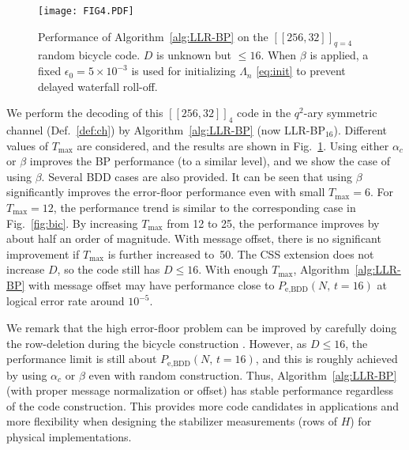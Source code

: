 \documentclass{ieeeaccess}
\theoremstyle{definition}		%
\begin{document}
\begin{figure} 
	\centering \texttt{[image: FIG4.PDF]}
	\caption{
	Performance of Algorithm~\ref{alg:LLR-BP} on the $[[256,32]]_{q=4}$ random bicycle code. $D$ is unknown but $\le 16$.
	When $\beta$ is applied, a fixed $\epsilon_0=5\times 10^{-3}$ is used for initializing $\Lambda_n$ \eqref{eq:init} 
	to prevent delayed waterfall roll-off.
	}\label{fig:256_q4}
\end{figure}

We perform the decoding of this  $[[256,32]]_{4}$ code in the \mbox{$q^2$-ary} symmetric channel (Def.~\ref{def:ch})
by Algorithm~\ref{alg:LLR-BP} (now LLR-BP$_{16}$). 
%
Different values of $T_{\max}$ are considered, and the results are shown in Fig.~\ref{fig:256_q4}. 
Using either $\alpha_c$ or $\beta$ improves the BP performance (to a similar level), and we show the case of using $\beta$.
%
Several BDD cases are also provided.
It can be seen that using $\beta$ significantly improves the error-floor performance even with small ${T_{\max}=6}$.
For ${T_{\max}=12}$, the performance trend is similar to the corresponding case in Fig.~\ref{fig:bic}.
By increasing $T_{\max}$ from 12 to 25, the performance improves by about  half an order of magnitude.
With message offset, there is no significant improvement if $T_{\max}$ is further increased to~50.
The CSS extension does not increase $D$, so the code still has $D\le 16$.
With enough $T_{\max}$, Algorithm~\ref{alg:LLR-BP} with message offset may have performance close to $P_\text{e,BDD}(N,\,t=16)$ 
at logical error rate around $10^{-5}$.



We remark that the high error-floor problem can be improved by carefully doing the row-deletion during the bicycle construction \cite{MMM04,KL20b}. 
However, as ${D\le 16}$, the performance limit is still about ${P_\text{e,BDD}(N,\,t=16)}$, and this is roughly achieved by using $\alpha_c$ or $\beta$ even with random construction.
%
Thus, Algorithm~\ref{alg:LLR-BP} (with proper message normalization or offset) has stable performance regardless of the code construction.
This provides more {code candidates in applications} and more flexibility when designing the stabilizer measurements (rows of $H$) for physical implementations.
\end{document}
